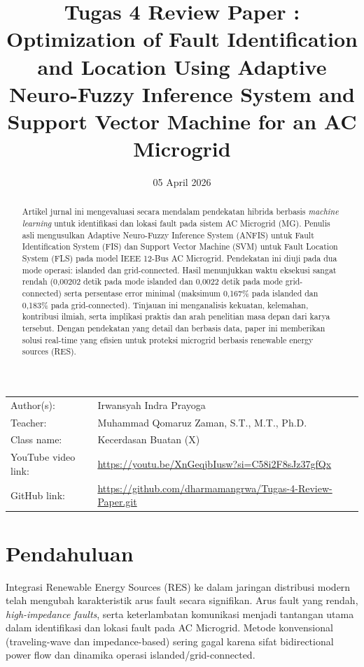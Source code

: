\documentclass{article}
\title{Tugas 4 Review Paper : Optimization of Fault Identification and Location Using Adaptive Neuro-Fuzzy Inference System and Support Vector Machine for an AC Microgrid
}
\date{05 April 2026}
\begin{document}
\maketitle


\noindent\begin{tabular}{@{}ll}
    Author(s): & Irwansyah Indra Prayoga\\
     Teacher: &  Muhammad Qomaruz Zaman, S.T., M.T., Ph.D.\\
     Class name: & Kecerdasan Buatan (X)\\
     YouTube video link: & \url{https://youtu.be/XnGeqjbIusw?si=C58i2F8sJz37gfQx} \\
     GitHub link: & \url{https://github.com/dharmamangrwa/Tugas-4-Review-Paper.git}
\end{tabular}
\vspace{2cm}


\begin{abstract}
Artikel jurnal ini mengevaluasi secara mendalam pendekatan hibrida berbasis \textit{machine learning} untuk identifikasi dan lokasi fault pada sistem AC Microgrid (MG). Penulis asli mengusulkan Adaptive Neuro-Fuzzy Inference System (ANFIS) untuk Fault Identification System (FIS) dan Support Vector Machine (SVM) untuk Fault Location System (FLS) pada model IEEE 12-Bus AC Microgrid. Pendekatan ini diuji pada dua mode operasi: islanded dan grid-connected. Hasil menunjukkan waktu eksekusi sangat rendah (0,00202 detik pada mode islanded dan 0,0022 detik pada mode grid-connected) serta persentase error minimal (maksimum 0,167\% pada islanded dan 0,183\% pada grid-connected). Tinjauan ini menganalisis kekuatan, kelemahan, kontribusi ilmiah, serta implikasi praktis dan arah penelitian masa depan dari karya tersebut. Dengan pendekatan yang detail dan berbasis data, paper ini memberikan solusi real-time yang efisien untuk proteksi microgrid berbasis renewable energy sources (RES).
\end{abstract}

\section{Pendahuluan}
Integrasi Renewable Energy Sources (RES) ke dalam jaringan distribusi modern telah mengubah karakteristik arus fault secara signifikan. Arus fault yang rendah, \textit{high-impedance faults}, serta keterlambatan komunikasi menjadi tantangan utama dalam identifikasi dan lokasi fault pada AC Microgrid. Metode konvensional (traveling-wave dan impedance-based) sering gagal karena sifat bidirectional power flow dan dinamika operasi islanded/grid-connected.
\end{document}
